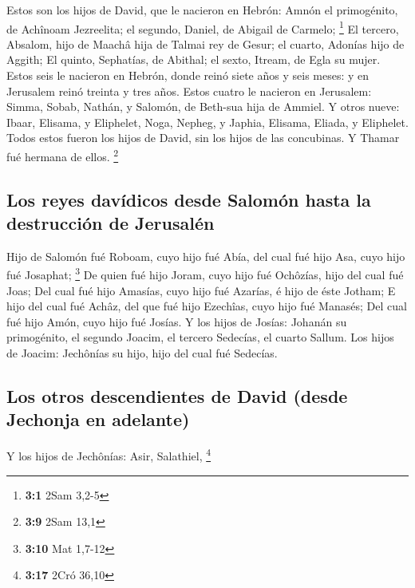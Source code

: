  Estos son los hijos de David, que le nacieron en Hebrón:
Amnón el primogénito, de Achînoam Jezreelita; el segundo, Daniel, de
Abigail de Carmelo; \footnote{\textbf{3:1} 2Sam 3,2-5}  El
tercero, Absalom, hijo de Maachâ hija de Talmai rey de Gesur; el cuarto,
Adonías hijo de Aggith;  El quinto, Sephatías, de Abithal;
el sexto, Itream, de Egla su mujer.  Estos seis le nacieron
en Hebrón, donde reinó siete años y seis meses: y en Jerusalem reinó
treinta y tres años.  Estos cuatro le nacieron en Jerusalem:
Simma, Sobab, Nathán, y Salomón, de Beth-sua hija de Ammiel.
 Y otros nueve: Ibaar, Elisama, y Eliphelet, 
Noga, Nepheg, y Japhia,  Elisama, Eliada, y Eliphelet.
 Todos estos fueron los hijos de David, sin los hijos de las
concubinas. Y Thamar fué hermana de ellos. \footnote{\textbf{3:9} 2Sam
  13,1}

\hypertarget{los-reyes-davuxeddicos-desde-salomuxf3n-hasta-la-destrucciuxf3n-de-jerusaluxe9n}{%
\subsection{Los reyes davídicos desde Salomón hasta la destrucción de
Jerusalén}\label{los-reyes-davuxeddicos-desde-salomuxf3n-hasta-la-destrucciuxf3n-de-jerusaluxe9n}}

 Hijo de Salomón fué Roboam, cuyo hijo fué Abía, del cual
fué hijo Asa, cuyo hijo fué Josaphat; \footnote{\textbf{3:10} Mat 1,7-12}
 De quien fué hijo Joram, cuyo hijo fué Ochôzías, hijo del
cual fué Joas;  Del cual fué hijo Amasías, cuyo hijo fué
Azarías, é hijo de éste Jotham;  E hijo del cual fué Achâz,
del que fué hijo Ezechîas, cuyo hijo fué Manasés;  Del cual
fué hijo Amón, cuyo hijo fué Josías.  Y los hijos de
Josías: Johanán su primogénito, el segundo Joacim, el tercero Sedecías,
el cuarto Sallum.  Los hijos de Joacim: Jechônías su hijo,
hijo del cual fué Sedecías.

\hypertarget{los-otros-descendientes-de-david-desde-jechonja-en-adelante}{%
\subsection{Los otros descendientes de David (desde Jechonja en
adelante)}\label{los-otros-descendientes-de-david-desde-jechonja-en-adelante}}

 Y los hijos de Jechônías: Asir, Salathiel, \footnote{\textbf{3:17}
  2Cró 36,10}

